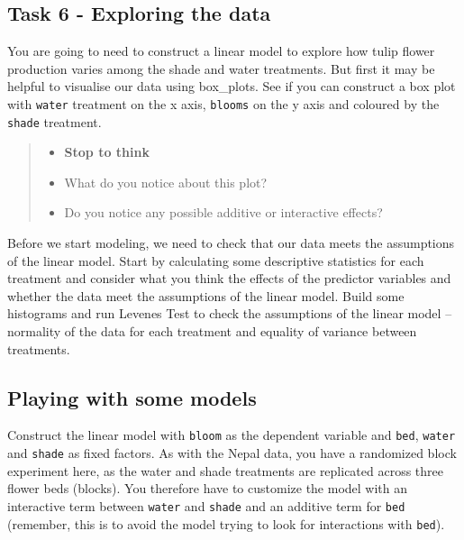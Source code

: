 \documentclass[
]{book}
\providecommand{\tightlist}{%
  \setlength{\itemsep}{0pt}\setlength{\parskip}{0pt}}
\begin{document}
\subsection{Task 6 - Exploring the data}\label{task-6---exploring-the-data}

You are going to need to construct a linear model to explore how tulip flower production varies among the shade and water treatments. But first it may be helpful to visualise our data using box\_plots. See if you can construct a box plot with \texttt{water} treatment on the x axis, \texttt{blooms} on the y axis and coloured by the \texttt{shade} treatment.

\begin{quote}
\begin{itemize}
\tightlist
\item
  \textbf{Stop to think}
\item
  What do you notice about this plot?
\item
  Do you notice any possible additive or interactive effects?
\end{itemize}
\end{quote}

Before we start modeling, we need to check that our data meets the assumptions of the linear model. Start by calculating some descriptive statistics for each treatment and consider what you think the effects of the predictor variables and whether the data meet the assumptions of the linear model. Build some histograms and run Levenes Test to check the assumptions of the linear model -- normality of the data for each treatment and equality of variance between treatments.

\subsection{Playing with some models}\label{playing-with-some-models}

Construct the linear model with \texttt{bloom} as the dependent variable and \texttt{bed}, \texttt{water} and \texttt{shade} as fixed factors. As with the Nepal data, you have a randomized block experiment here, as the water and shade treatments are replicated across three flower beds (blocks). You therefore have to customize the model with an interactive term between \texttt{water} and \texttt{shade} and an additive term for \texttt{bed} (remember, this is to avoid the model trying to look for interactions with \texttt{bed}).
\end{document}
